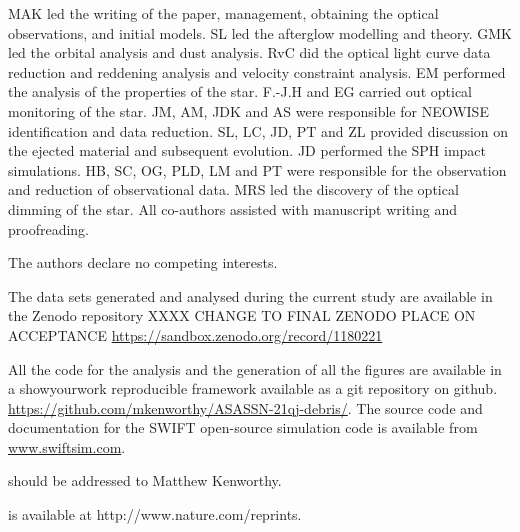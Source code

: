 \documentclass[sn-nature]{sn-jnl}%
\begin{document}
MAK led the writing of the paper, management, obtaining the optical observations, and initial models.
%
SL led the afterglow modelling and theory.
%
GMK led the orbital analysis and dust analysis.
%
RvC did the optical light curve data reduction and reddening analysis and velocity constraint analysis.
%
EM performed the analysis of the properties of the star.
%
F.-J.H and EG carried out optical monitoring of the star.
%
JM, AM, JDK and AS were responsible for NEOWISE identification and data reduction.
%
SL, LC, JD, PT and ZL provided discussion on the ejected material and subsequent evolution.
%
JD performed the SPH impact simulations.
%
HB, SC, OG, PLD, LM and PT were responsible for the observation and reduction of observational data.
%
MRS led the discovery of the optical dimming of the star.
%
All co-authors assisted with manuscript writing and proofreading.

 The authors declare no competing interests.

The data sets generated and analysed during the current study are available in the Zenodo repository XXXX CHANGE TO FINAL ZENODO PLACE ON ACCEPTANCE \url{https://sandbox.zenodo.org/record/1180221}

All the code for the analysis and the generation of all the figures  are available in a showyourwork \citep{Luger2021} reproducible framework available as a git repository on github. \url{https://github.com/mkenworthy/ASASSN-21qj-debris/}. The source code and documentation for the SWIFT open-source simulation code is available from \url{www.swiftsim.com}.


should be addressed to Matthew Kenworthy.

 is available at http://www.nature.com/reprints.
\newpage

\end{document}
